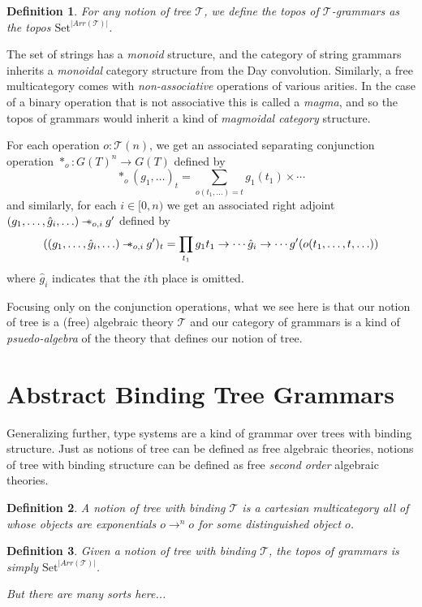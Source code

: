 \documentclass[12pt]{article}
\newcommand{\Set}{\textrm{Set}}
\newtheorem{definition}{Definition}
\newcommand\rsepimp{\mathbin{-\mkern-6mu*}}
\newcommand\sepconj{\mathbin{*}}
\begin{document}
\begin{definition}
  For any notion of tree $\mathcal T$, we define the topos of
  $\mathcal T$-grammars as the topos $\Set^{|Arr(\mathcal T)|}$.
\end{definition}

The set of strings has a \emph{monoid} structure, and the category of
string grammars inherits a \emph{monoidal} category structure from the
Day convolution.
%
Similarly, a free multicategory comes with \emph{non-associative}
operations of various arities. In the case of a binary operation that
is not associative this is called a \emph{magma}, and so the topos of
grammars would inherit a kind of \emph{magmoidal category} structure.

For each operation $o : \mathcal T(n)$, we get an associated
separating conjunction operation $\sepconj_o : G(T)^n \to G(T)$ defined by
\[ \sepconj_o(g_1,\ldots)_t = \sum_{o(t_1,\ldots) = t} g_1(t_1) \times \cdots\]
and similarly, for each $i \in [0,n)$ we get an associated right
adjoint $(g_1,\ldots,\hat g_i,\ldots)\rsepimp_{o,i} g'$ defined by
\[ ((g_1,\ldots,\hat g_i,\ldots)\rsepimp_{o,i} g')_t = \prod_{t_1} g_1 t_1 \to \cdots \hat g_i \to \cdots g'(o(t_1,\ldots,t,\ldots))\]
where $\hat g_i$ indicates that the $i$th place is omitted.

Focusing only on the conjunction operations, what we see here is that
our notion of tree is a (free) algebraic theory $\mathcal T$ and our
category of grammars is a kind of \emph{psuedo-algebra} of the theory
that defines our notion of tree.

\section{Abstract Binding Tree Grammars}

Generalizing further, type systems are a kind of grammar over trees
with binding structure. Just as notions of tree can be defined as free
algebraic theories, notions of tree with binding structure can be
defined as free \emph{second order} algebraic theories.

\begin{definition}
  A notion of tree with binding $\mathcal T$ is a cartesian multicategory all of
  whose objects are exponentials $o \to^n o$ for some distinguished
  object $o$.
\end{definition}

\begin{definition}
  Given a notion of tree with binding $\mathcal T$, the topos of
  grammars is simply $\Set^{|Arr(\mathcal T)|}$.

  But there are many sorts here...
\end{definition}
\end{document}
